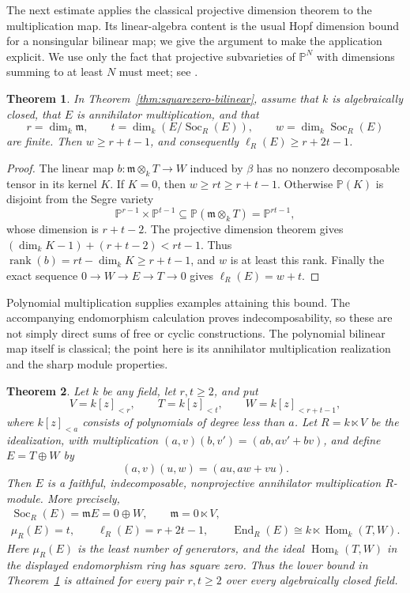 \documentclass[11pt]{amsart}
\theoremstyle{plain}
\newtheorem{theorem}{Theorem}[section]
\theoremstyle{definition}
\theoremstyle{remark}
\DeclareMathOperator{\Hom}{Hom}
\DeclareMathOperator{\End}{End}
\DeclareMathOperator{\Soc}{Soc}
\numberwithin{equation}{section}
\begin{document}
The next estimate applies the classical projective dimension theorem
to the multiplication map. Its linear-algebra content is the usual
Hopf dimension bound for a nonsingular bilinear map; we give the
argument to make the application explicit. We use only the fact that
projective subvarieties of $\mathbb P^N$ with dimensions summing to at
least $N$ must meet; see \cite[Chapter~I, Section~7]{Hartshorne77}.

\begin{theorem}\label{thm:squarezero-bound}
In Theorem~\ref{thm:squarezero-bilinear}, assume that $k$ is
algebraically closed, that $E$ is annihilator multiplication, and that
\[
 r=\dim_k\mathfrak m,\qquad t=\dim_k(E/\Soc_R(E)),\qquad
 w=\dim_k\Soc_R(E)
\]
are finite. Then $w\ge r+t-1$, and consequently
$\ell_R(E)\ge r+2t-1$.
\end{theorem}

\begin{proof}
The linear map $b:\mathfrak m\otimes_k T\to W$ induced by $\beta$
has no nonzero decomposable tensor in its kernel $K$.
If $K=0$, then $w\ge rt\ge r+t-1$.
Otherwise $\mathbb P(K)$ is disjoint from the Segre variety
\[
 \mathbb P^{r-1}\times\mathbb P^{t-1}
 \subseteq\mathbb P(\mathfrak m\otimes_k T)=\mathbb P^{rt-1},
\]
whose dimension is $r+t-2$.
The projective dimension theorem gives
$(\dim_kK-1)+(r+t-2)<rt-1$.
Thus $\operatorname{rank}(b)=rt-\dim_kK\ge r+t-1$, and $w$ is
at least this rank. Finally the exact sequence $0\to W\to E\to T\to0$
gives $\ell_R(E)=w+t$.
\end{proof}

Polynomial multiplication supplies examples attaining this bound.
The accompanying endomorphism calculation proves indecomposability,
so these are not simply direct sums of free or cyclic constructions.
The polynomial bilinear map itself is classical; the point here is its
annihilator multiplication realization and the sharp module properties.

\begin{theorem}\label{thm:sharp-indecomposable-family}
Let $k$ be any field, let $r,t\ge2$, and put
\[
 V=k[z]_{<r},\qquad T=k[z]_{<t},\qquad W=k[z]_{<r+t-1},
\]
where $k[z]_{<a}$ consists of polynomials of degree less than $a$.
Let $R=k\ltimes V$ be the idealization, with multiplication
$(a,v)(b,v')=(ab,av'+bv)$, and define $E=T\oplus W$ by
\[
 (a,v)(u,w)=(au,aw+vu).
\]
Then $E$ is a faithful, indecomposable, nonprojective annihilator
multiplication $R$-module. More precisely,
\[
 \begin{gathered}
 \Soc_R(E)=\mathfrak mE=0\oplus W,\qquad
 \mathfrak m=0\ltimes V,\\
 \mu_R(E)=t,\qquad \ell_R(E)=r+2t-1,\qquad
 \End_R(E)\cong k\ltimes\Hom_k(T,W).
 \end{gathered}
\]
Here $\mu_R(E)$ is the least number of generators, and the ideal
$\Hom_k(T,W)$ in the displayed endomorphism ring has square zero.
Thus the lower bound in Theorem~\ref{thm:squarezero-bound} is attained
for every pair $r,t\ge2$ over every algebraically closed field.
\end{theorem}
\end{document}
